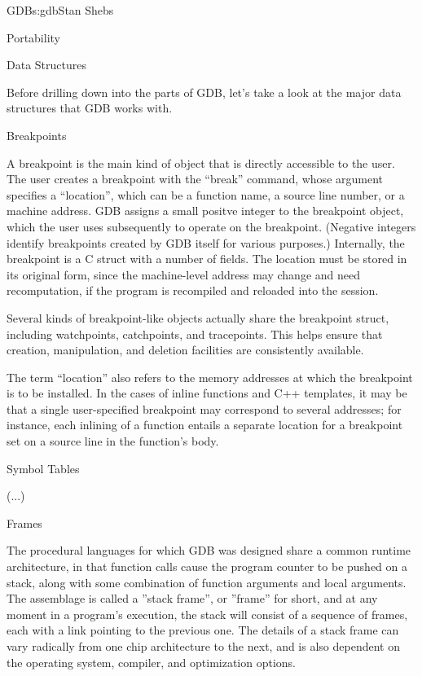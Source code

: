\begin{aosachapter}{GDB}{s:gdb}{Stan Shebs}
\begin{aosasect1}{Portability}
\end{aosasect1}

\begin{aosasect1}{Data Structures}

Before drilling down into the parts of GDB, let's take a look at the major
data structures that GDB works with.

\end{aosasect1}

\begin{aosasect1}{Breakpoints}

A breakpoint is the main kind of object that is directly accessible to
the user.  The user creates a breakpoint with the ``break'' command,
whose argument specifies a ``location'', which can be a function name,
a source line number, or a machine address.  GDB assigns a small
positve integer to the breakpoint object, which the user uses
subsequently to operate on the breakpoint.  (Negative integers
identify breakpoints created by GDB itself for various purposes.)
Internally, the breakpoint is a C struct with a number of fields.  The
location must be stored in its original form, since the machine-level
address may change and need recomputation, if the program is
recompiled and reloaded into the session.

Several kinds of breakpoint-like objects actually share the breakpoint
struct, including watchpoints, catchpoints, and tracepoints.  This
helps ensure that creation, manipulation, and deletion facilities are
consistently available.

The term ``location'' also refers to the memory addresses at which the
breakpoint is to be installed.  In the cases of inline functions and
C++ templates, it may be that a single user-specified breakpoint may
correspond to several addresses; for instance, each inlining of a
function entails a separate location for a breakpoint set on a source
line in the function's body.

\end{aosasect1}

\begin{aosasect1}{Symbol Tables}

(...)

\end{aosasect1}

\begin{aosasect1}{Frames}

The procedural languages for which GDB was designed share a common
runtime architecture, in that function calls cause the program counter
to be pushed on a stack, along with some combination of function
arguments and local arguments.  The assemblage is called a ''stack
frame'', or ''frame'' for short, and at any moment in a program's
execution, the stack will consist of a sequence of frames, each with a
link pointing to the previous one.  The details of a stack frame can
vary radically from one chip architecture to the next, and is also
dependent on the operating system, compiler, and optimization options.


\end{aosasect1}
\end{aosachapter}
